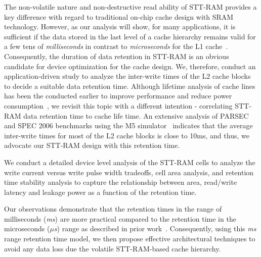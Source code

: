 The non-volatile nature and non-destructive read ability of STT-RAM provides a key difference with
regard to traditional on-chip cache design with SRAM technology. However, as our analysis will show,
for many applications, it is sufficient if the data stored in the last level of a cache hierarchy
remains valid for a few tens of {\it milliseconds} in contrast to {\it microseconds} for the L1 cache~\cite{3t1d-cache}.
Consequently, the duration of data retention in STT-RAM
is an obvious candidate for device optimization for the cache design. We, therefore, conduct an
application-driven study to analyze the inter-write times of the L2 cache blocks to decide a suitable
data retention time. Although lifetime analysis of cache lines has been the conducted earlier to
improve performance and reduce power consumption~\cite{cache-decay-2001,3t1d-cache}, we revisit this
topic with a different intention - correlating STT-RAM data retention time to cache life time. An
extensive analysis of PARSEC and SPEC 2006 benchmarks using the M5 simulator~\cite{M5} indicates that
the average inter-write times for most of the L2 cache blocks is close to 10ms, and thus, we advocate
our STT-RAM design with this retention time.

We conduct a detailed device level analysis of the STT-RAM cells to analyze the write current versus
write pulse width tradeoffs, cell area analysis, and retention time stability analysis to capture the
relationship between area, read/write latency and leakage power as a function of the retention time.

Our observations demonstrate that the retention times in the range of milliseconds ({\it ms}) are more practical compared to the retention time in the microseconds
({\it $\mu$s}) range as described in prior work~\cite{STTRAM:HPCA11}. Consequently, using this {\it ms} range retention time model, we then propose effective
architectural techniques to avoid any data loss due the volatile STT-RAM-based cache hierarchy.


